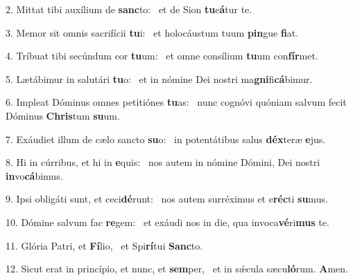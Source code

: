 2. Mittat tibi auxílium de \textbf{sanc}to: \ast\  et de Sion \textbf{tu}e\textbf{á}tur te.\

3. Memor sit omnis sacrifícii \textbf{tu}i: \ast\  et holocáustum tuum \textbf{pin}gue \textbf{fi}at.\

4. Tríbuat tibi secúndum cor \textbf{tu}um: \ast\  et omne consílium \textbf{tu}um con\textbf{fír}met.\

5. Lætábimur in salutári \textbf{tu}o: \ast\  et in nómine Dei nostri ma\textbf{gni}fi\textbf{cá}bimur.\

6. Impleat Dóminus omnes petitiónes \textbf{tu}as: \ast\  nunc cognóvi quóniam salvum fecit Dóminus \textbf{Chris}tum \textbf{su}um.\

7. Exáudiet illum de cælo sancto \textbf{su}o: \ast\  in potentátibus salus \textbf{déx}teræ \textbf{e}jus.\

8. Hi in cúrribus, et hi in \textbf{e}quis: \ast\  nos autem in nómine Dómini, Dei nostri \textbf{in}vo\textbf{cá}bimus.\

9. Ipsi obligáti sunt, et ceci\textbf{dé}runt: \ast\  nos autem surréximus et e\textbf{réc}ti \textbf{su}mus.\

10. Dómine salvum fac \textbf{re}gem: \ast\  et exáudi nos in die, qua invoca\textbf{vé}ri\textbf{mus} te.\

11. Glória Patri, et \textbf{Fí}lio, \ast\  et Spi\textbf{rí}tui \textbf{Sanc}to.\

12. Sicut erat in princípio, et nunc, et \textbf{sem}per, \ast\  et in sǽcula sæcu\textbf{ló}rum. \textbf{A}men.\

